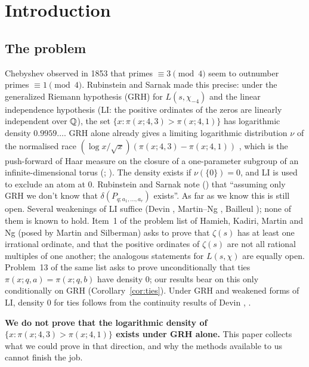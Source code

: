 \section{Introduction}\label{sec:intro}

\subsection{The problem}
Chebyshev observed in 1853 that primes $\equiv3\pmod4$ seem to outnumber primes $\equiv1\pmod4$. Rubinstein and Sarnak \cite{RS} made this precise: under the generalized Riemann hypothesis (GRH) for $L(s,\chi_{-4})$ and the linear independence hypothesis (LI: the positive ordinates of the zeros are linearly independent over $\mathbb Q$), the set $\{x:\pi(x;4,3)>\pi(x;4,1)\}$ has logarithmic density $0.9959\ldots$. GRH alone already gives a limiting logarithmic distribution $\nu$ of the normalised race $(\log x/\sqrt x)(\pi(x;4,3)-\pi(x;4,1))$ \cite{RS}, which is the push-forward of Haar measure on the closure of a one-parameter subgroup of an infinite-dimensional torus (\cite{ANS,Devin,Bailleul}; \cite[Theorem~1.3]{GO}). The density exists if $\nu(\{0\})=0$, and LI is used to exclude an atom at $0$. Rubinstein and Sarnak note (\cite[p.~174]{RS}) that ``assuming only GRH we don't know that $\delta(P_{q;a_1,\dots,a_r})$ exists''. As far as we know this is still open. Several weakenings of LI suffice (Devin \cite[Theorems~2.2, 5.4]{Devin}, Martin--Ng \cite{MN}, Bailleul \cite{Bailleul}); none of them is known to hold. Item~1 of the problem list of Hamieh, Kadiri, Martin and Ng \cite{HKMN} (posed by Martin and Silberman) asks to prove that $\zeta(s)$ has at least one irrational ordinate, and that the positive ordinates of $\zeta(s)$ are not all rational multiples of one another; the analogous statements for $L(s,\chi)$ are equally open. Problem~13 of the same list asks to prove unconditionally that ties $\pi(x;q,a)=\pi(x;q,b)$ have density $0$; our results bear on this only conditionally on GRH (Corollary~\ref{cor:ties}). Under GRH and weakened forms of LI, density $0$ for ties follows from the continuity results of Devin \cite[Theorem~2.2]{Devin}, \cite[Corollary~2]{Devin2}.

\textbf{We do not prove that the logarithmic density of $\{x:\pi(x;4,3)>\pi(x;4,1)\}$ exists under GRH alone.} This paper collects what we could prove in that direction, and why the methods available to us cannot finish the job.

